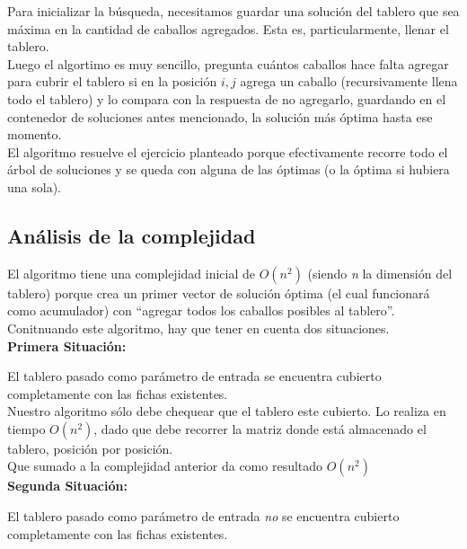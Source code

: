 Para inicializar la b\'usqueda, necesitamos guardar una soluci\'on del tablero que sea m\'axima en la cantidad de caballos agregados. Esta es, particularmente, llenar el tablero.\\

Luego el algortimo es muy sencillo, pregunta cu\'antos caballos hace falta agregar para cubrir el tablero si en la posici\'on $i, j$ agrega un caballo (recursivamente llena todo el tablero) y lo compara con la respuesta de no agregarlo, guardando en el contenedor de soluciones antes mencionado, la soluci\'on m\'as \'optima hasta ese momento.\\

El algoritmo resuelve el ejercicio planteado porque efectivamente recorre todo el \'arbol de soluciones y se queda con alguna de las \'optimas (o la \'optima si hubiera una sola).\\

\newpage

\subsection{An\'alisis de la complejidad}
El algoritmo tiene una complejidad inicial de $O(n^{2})$ (siendo \emph{n} la dimensi\'on del tablero) porque crea un primer vector de soluci\'on \'optima (el cual funcionar\'a como acumulador) con ``agregar todos los caballos posibles al tablero''.\\

Conitnuando este algoritmo, hay que tener en cuenta dos situaciones.\\

\textbf{Primera Situaci\'on: }

El tablero pasado como par\'ametro de entrada se encuentra cubierto completamente con las fichas existentes.\\

Nuestro algoritmo s\'olo debe chequear que el tablero este cubierto. Lo realiza en tiempo $O(n^{2})$, dado que debe recorrer la matriz donde est\'a almacenado el tablero, posici\'on por posici\'on.\\

Que sumado a la complejidad anterior da como resultado $O(n^{2})$\\

\textbf{Segunda Situaci\'on: }

El tablero pasado como par\'ametro de entrada \emph{no} se encuentra cubierto completamente con las fichas existentes.\\

